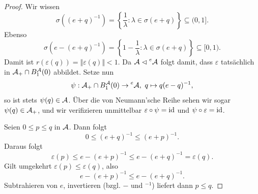 \begin{proof}
    Wir wissen
    $$ \sigma((e + q)^{-1}) = \left\{ \frac{1}{\lambda} : \lambda \in \sigma(e + q) \right\} \subseteq (0, 1]. $$
    Ebenso
    $$ \sigma(e - (e+q)^{-1}) = \left\{ 1 - \frac{1}{\lambda} : \lambda \in \sigma(e+q) \right\} \subseteq [0, 1). $$
    Damit ist $r(\varepsilon(q)) = \Vert \varepsilon(q) \Vert < 1$. Da $\mathcal{A} \vartriangleleft \prescript{e}{}{\mathcal{A}}$ folgt damit, dass $\varepsilon$ tatsächlich in $\mathcal{A}_+ \cap B_1^{\mathcal{A}}(0)$ abbildet.
    Setze nun
    $$ \psi : \mathcal{A}_+ \cap B_1^{\mathcal{A}}(0) \to \prescript{e}{}{\mathcal{A}}, \ q \mapsto q (e-q)^{-1}, $$
    so ist stets $\psi(q) \in \mathcal{A}$. Über die von Neumann'sche Reihe sehen wir sogar $\psi(q) \in \mathcal{A}_+$, und wir verifizieren unmittelbar $\varepsilon \circ \psi = \mathrm{id}$ und $\psi \circ \varepsilon = \mathrm{id}$.

    Seien $0 \leq p \leq q$ in $\mathcal{A}$. Dann folgt
    \[
        0 \leq (e + q)^{-1} \leq (e + p)^{-1}.
    \]
    Daraus folgt
    \[
        \varepsilon(p) \leq e - (e + p)^{-1} \leq e - (e + q)^{-1} = \varepsilon(q).
    \]
    Gilt umgekehrt $\varepsilon(p) \leq \varepsilon(q)$, also
    \[
        e - (e + p)^{-1} \leq e - (e + q)^{-1}.
    \]
    Subtrahieren von $e$, invertieren (bzgl. $-$ und $^{-1}$) liefert dann $p \leq q$.
\end{proof}
